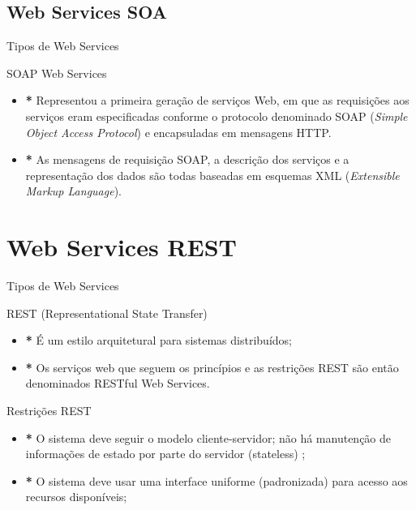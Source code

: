 \documentclass{beamer}
\begin{document}
\subsection{Web Services SOA}
\begin{frame}{Tipos de Web Services}
\begin{exampleblock}{SOAP Web Services}
    \begin{itemize}
        \item  \textbf{*} Representou a primeira geração de serviços Web, em que as requisições aos serviços eram especificadas conforme o protocolo denominado SOAP (\textit{Simple Object Access Protocol}) e encapsuladas em mensagens HTTP.
        \item \textbf{*} As mensagens de requisição SOAP, a descrição dos serviços e a representação dos dados são todas baseadas em esquemas XML (\textit{Extensible Markup Language}).
    \end{itemize}
\end{exampleblock}
    
\end{frame}
\section{Web Services REST}
\begin{frame}{Tipos de Web Services}
    \begin{exampleblock}{REST (Representational State Transfer)}
        \begin{itemize}
            \item \textbf{*} É um estilo arquitetural para sistemas distribuídos;
            \item \textbf{*} Os serviços web que seguem os princípios e as restrições REST são então denominados RESTful Web Services.
        \end{itemize} 
    \end{exampleblock}
    \begin{exampleblock}{Restrições REST}
    \begin{itemize}
        \item \textbf{*} O sistema deve seguir o modelo cliente-servidor; não há manutenção de informações de estado por parte do servidor (stateless) \cite{tanembaum2007sd};
        \item \textbf{*} O sistema deve usar uma interface uniforme (padronizada) para acesso aos recursos disponíveis;
    \end{itemize}
        
    \end{exampleblock}
\end{frame}
\end{document}

